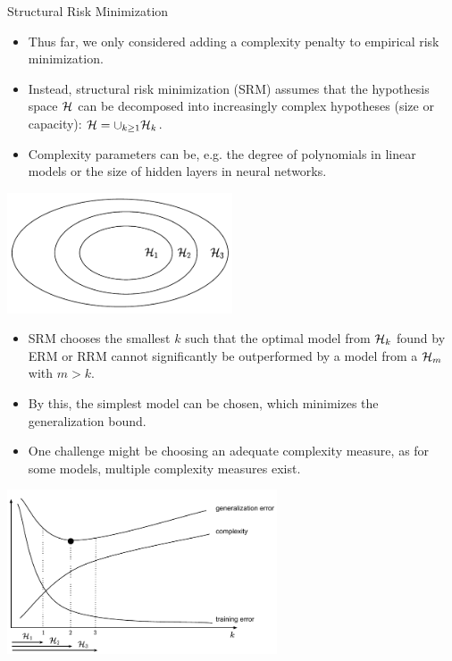 \documentclass[11pt,compress,t,notes=noshow, xcolor=table]{beamer}
\begin{document}
\begin{vbframe} {Structural Risk Minimization}

\begin{itemize}
  \item Thus far, we only considered adding a complexity penalty to empirical risk minimization. 
  \item Instead,  structural risk minimization (SRM) assumes that the hypothesis space $\mathcal{H}$ can be decomposed into increasingly complex hypotheses (size or capacity): $\mathcal{H} = \cup_{k \geq 1 }\mathcal{H}_{k}$. 
  \item Complexity parameters can be, e.g. the degree of polynomials in linear models or the size of hidden layers in neural networks.  
\end{itemize}

\begin{center}
\includegraphics[width=0.5\textwidth]{figure_man/fig-regu-srm-1}
\end{center}

\framebreak


\begin{itemize}

    \item SRM chooses the smallest $k$ such that the optimal model from $\mathcal{H}_k$ found by ERM or RRM cannot significantly
        be outperformed by a model from a $\mathcal{H}_m$ with $m > k$.
  \item By this, the simplest model can be chosen, which minimizes the generalization bound.  
  \item One challenge might be choosing an adequate complexity measure, as for some models, multiple complexity measures exist.
\end{itemize}

\begin{center}
\includegraphics[width=0.6\textwidth]{figure_man/fig-regu-srm-2}
\end{center}


\end{vbframe}
\end{document}
